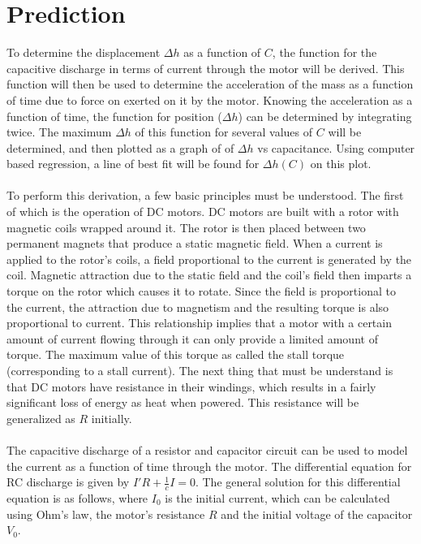 \documentclass[12pt,letterpaper]{article}
\begin{document}
\section{Prediction}
To determine the displacement $\Delta h$ as a function of $C$, the function for the capacitive discharge in terms of current through the motor will be derived. This function will then be used to determine the acceleration of the mass as a function of time due to force on exerted on it by the motor. Knowing the acceleration as a function of time, the function for position ($\Delta h$) can be determined by integrating twice. The maximum $\Delta h$ of this function for several values of $C$ will be determined, and then plotted as a graph of of $\Delta h$ vs capacitance. Using computer based regression, a line of best fit will be found for $\Delta h(C)$ on this plot.\\\\
To perform this derivation, a few basic principles must be understood. The first of which is the operation of DC motors. DC motors are built with a rotor with magnetic coils wrapped around it. The rotor is then placed between two permanent magnets that produce a static magnetic field. When a current is applied to the rotor's coils, a field proportional to the current is generated by the coil. Magnetic attraction due to the static field and the coil's field then imparts a torque on the rotor which causes it to rotate. Since the field is proportional to the current, the attraction due to magnetism and the resulting torque is also proportional to current. This relationship implies that a motor with a certain amount of current flowing through it can only provide a limited amount of torque. The maximum value of this torque as called the stall torque (corresponding to a stall current). The next thing that must be understand is that DC motors have resistance in their windings, which results in a fairly significant loss of energy as heat when powered. This resistance will be generalized as $R$ initially.\\\\
The capacitive discharge of a resistor and capacitor circuit can be used to model the current as a function of time through the motor. The differential equation for RC discharge is given by $I'R + \frac{1}{c}I = 0$. The general solution for this differential equation is as follows, where $I_0$ is the initial current, which can be calculated using Ohm's law, the motor's resistance $R$ and the initial voltage of the capacitor $V_0$.
\end{document}
